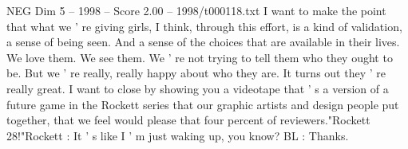 \begin{textsample}{NEG Dim 5 – 1998 – Score 2.00 – 1998/t000118.txt}
I want to make the point that what we ' re giving girls, I think, through this effort, is a kind of validation, a sense of being seen.
And a sense of the choices that are available in their lives.
We love them.
We see them.
We ' re not trying to tell them who they ought to be.
But we ' re really, really happy about who they are.
It turns out they ' re really great.
I want to close by showing you a videotape that ' s a version of a future game in the Rockett series that our graphic artists and design people put together, that we feel would please that four percent of reviewers."Rockett 28!"Rockett : It ' s like I ' m just waking up, you know?
BL : Thanks.

\end{textsample}
